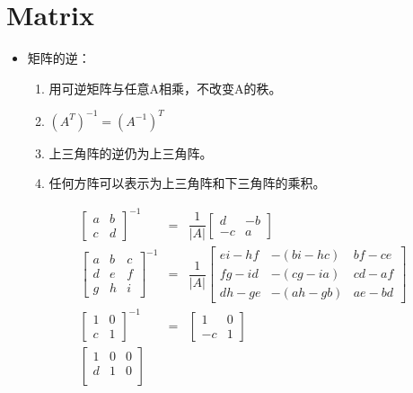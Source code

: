\documentclass[UTF8,9pt]{ctexart}
\begin{document}
\section{Matrix}
\begin{itemize}
	\item 矩阵的逆：\\
		\begin{enumerate}
			\item 用可逆矩阵与任意A相乘，不改变A的秩。\\
			\item $(A^T)^{-1}=(A^{-1})^T$\\
			\item 上三角阵的逆仍为上三角阵。\\
			\item 任何方阵可以表示为上三角阵和下三角阵的乘积。\\
		\end{enumerate}
		$$\begin{array}{rcl}
			\begin{bmatrix}
				a & b \\
				c & d
			\end{bmatrix}^{-1}
			& = &
			\dfrac{1}{|A|}\begin{bmatrix}
				d  & -b \\
				-c & a
			\end{bmatrix} \\
			\begin{bmatrix}
				a & b & c \\
				d & e & f \\
				g & h & i
			\end{bmatrix}^{-1}
			& = &
			\dfrac{1}{|A|}\begin{bmatrix}
				ei-hf & -(bi-hc) & bf-ce \\
				fg-id & -(cg-ia) & cd-af \\
				dh-ge & -(ah-gb) & ae-bd
			\end{bmatrix} \\
			\begin{bmatrix}
				1 & 0 \\
				c & 1
			\end{bmatrix}^{-1}
			& = &
			\begin{bmatrix}
				1  & 0 \\
				-c & 1
			\end{bmatrix}               \\
			\begin{bmatrix}
				1 & 0 & 0 \\
				d & 1 & 0 \\

\end{bmatrix}
\end{array}$$
\end{itemize}
\end{document}
